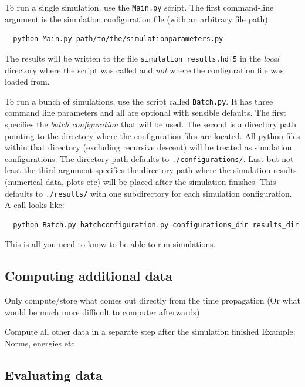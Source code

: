 \documentclass[a4paper,10pt]{report}
\begin{document}
To run a single simulation, use the \texttt{Main.py} script. The first command-line
argument is the simulation configuration file (with an arbitrary file path).

\begin{verbatim}
  python Main.py path/to/the/simulationparameters.py
\end{verbatim}

The results will be written to the file \texttt{simulation\_results.hdf5}
in the \emph{local} directory where the script was called and \emph{not}
where the configuration file was loaded from.

To run a bunch of simulations, use the script called \texttt{Batch.py}. It
has three command line parameters and all are optional with sensible defaults.
The first specifies the \emph{batch configuration} that will be used. The second
is a directory path pointing to the directory where the configuration files
are located. All python files within that directory (excluding recursive descent)
will be treated as simulation configurations. The directory path defaults to
\texttt{./configurations/}. Last but not least the third argument specifies the
directory path where the simulation results (numerical data, plots etc) will be
placed after the simulation finishes. This defaults to \texttt{./results/}
with one subdirectory for each simulation configuration. A call looks like:

\begin{verbatim}
  python Batch.py batchconfiguration.py configurations_dir results_dir
\end{verbatim}

This is all you need to know to be able to run simulations.



\subsection{Computing additional data}

Only compute/store what comes out directly from the time propagation
(Or what would be much more difficult to computer afterwards)

Compute all other data in a separate step after the simulation finished
Example: Norms, energies etc

\subsection{Evaluating data}
\end{document}
